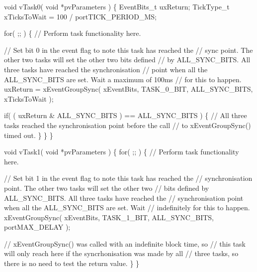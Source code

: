 \begin{DoxyPre}void vTask0( void *pvParameters )
\{
EventBits\_t uxReturn;
TickType\_t xTicksToWait = 100 / portTICK\_PERIOD\_MS;\end{DoxyPre}



\begin{DoxyPre}    for( ;; )
    \{
    // Perform task functionality here.\end{DoxyPre}



\begin{DoxyPre}    // Set bit 0 in the event flag to note this task has reached the
    // sync point.  The other two tasks will set the other two bits defined
    // by ALL\_SYNC\_BITS.  All three tasks have reached the synchronisation
    // point when all the ALL\_SYNC\_BITS are set.  Wait a maximum of 100ms
    // for this to happen.
    uxReturn = xEventGroupSync( xEventBits, TASK\_0\_BIT, ALL\_SYNC\_BITS, xTicksToWait );\end{DoxyPre}



\begin{DoxyPre}    if( ( uxReturn \& ALL\_SYNC\_BITS ) == ALL\_SYNC\_BITS )
    \{
        // All three tasks reached the synchronisation point before the call
        // to xEventGroupSync() timed out.
    \}
   \}
\}\end{DoxyPre}



\begin{DoxyPre}void vTask1( void *pvParameters )
\{
    for( ;; )
    \{
    // Perform task functionality here.\end{DoxyPre}



\begin{DoxyPre}    // Set bit 1 in the event flag to note this task has reached the
    // synchronisation point.  The other two tasks will set the other two
    // bits defined by ALL\_SYNC\_BITS.  All three tasks have reached the
    // synchronisation point when all the ALL\_SYNC\_BITS are set.  Wait
    // indefinitely for this to happen.
    xEventGroupSync( xEventBits, TASK\_1\_BIT, ALL\_SYNC\_BITS, portMAX\_DELAY );\end{DoxyPre}



\begin{DoxyPre}    // xEventGroupSync() was called with an indefinite block time, so
    // this task will only reach here if the syncrhonisation was made by all
    // three tasks, so there is no need to test the return value.
    \}
\}\end{DoxyPre}



